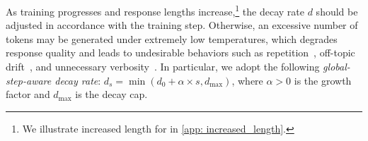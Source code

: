 As training progresses and response lengths increase,\footnote{We illustrate increased length for \alg in \cref{app: increased_length}. } the decay rate $d$ should be adjusted in accordance with the training step.
%
Otherwise, an excessive number of tokens may be generated under extremely low temperatures, which degrades response quality and leads to undesirable behaviors such as repetition~\citep{guo2025deepseek}, off-topic drift~\citep{spataru2024know}, and unnecessary verbosity~\citep{Holtzman2020The}. 
%
In particular, we adopt the following \emph{global-step-aware decay rate}:
$d_s = \min(d_0 + \alpha \times s, d_{\max})$, where $\alpha > 0$ is the growth factor and $d_{\max}$ is the decay cap. 



%


